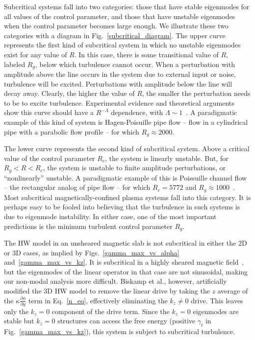 \documentclass[letter,scriptaddress,twocolumn, prl,showkeys]{revtex4}
\newcommand{\pdiff}[2]{\frac{\partial#1}{\partial#2}}
\begin{document}
Subcritical systems fall into two categories: those that have stable eigenmodes for all values of the control parameter, and those that have unstable eigenmodes
when the control parameter becomes large enough. We illustrate these two categories with a diagram in Fig.~\ref{subcritical_diagram}. 
The upper curve represents the first kind of subcritical system in which no unstable eigenmodes exist for any value of $R$. In this
case, there is some transitional value of $R$, labeled $R_g$, below which turbulence cannot occur. When a perturbation with amplitude above the line occurs in the system due to external input or noise, 
turbulence will be excited. Perturbations with amplitude below the line will decay away. Clearly, the higher the value of $R$, the smaller the perturbation needs to be to excite turbulence.
Experimental evidence and theoretical arguments show this curve should have a $R^{-\Lambda}$ dependence, with $\Lambda \sim 1$~\cite{grossmann2000}.
A paradigmatic example of this kind of system is Hagen-Poisuille pipe flow -- flow in a cylindrical pipe with a parabolic flow profile -- for which $R_g \approx 2000$.

The lower curve represents the second kind of subcritical system. Above a critical value of the control parameter $R_c$, the system is linearly unstable. But, for $R_g < R < R_c$, the system is
unstable to finite amplitude perturbations, or ``nonlinearly'' unstable. A paradigmatic example of this is Poissuille channel flow -- the rectangular analog of pipe flow -- for which
$R_c = 5772$ and $R_g \approx 1000$~\cite{grossmann2000}. Most subcritical magnetically-confined plasma systems fall into this category. It is perhaps easy to be fooled into believing that the turbulence
in such systems is due to eigenmode instability. In either case, one of the most important predictions is the minimum turbulent control parameter $R_g$.

The HW model in an unsheared magnetic slab is not subcritical in either the 2D or 3D cases, as implied by Figs.~\ref{gamma_max_vs_alpha} and~\ref{gamma_max_vs_kz}. It is subcritical in a highly sheared
magnetic field~\cite{drake1995}, but the eigenmodes of the linear operator in that case are not sinusoidal, making our non-modal analysis more difficult. Biskamp et al., however, artificially modified the
3D HW model to remove the linear drive by taking the $z$ average of the $\kappa \pdiff{\phi}{y}$ term in Eq.~\ref{n_eq}, effectively eliminating the $k_z \ne 0$ drive. This leaves only the $k_z = 0$
component of the drive term. Since the $k_z = 0$ eigenmodes are stable but $k_z = 0$ structures can access the free energy (positive $\gamma_t$ in Fig.~\ref{gamma_max_vs_kz}), this system is subject
to subcritical turbulence.
\end{document}
